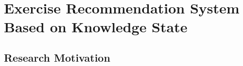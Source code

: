 \chapter{Exercise Recommendation System Based on Knowledge State}

\ifpdf
  \graphicspath{{Chapter4/Figs/Raster/}{Chapter4/Figs/PDF/}{Chapter4/Figs/}}
\else
  \graphicspath{{Chapter4/Figs/Vector/}{Chapter4/Figs/}}
\fi

\section{Research Motivation}




